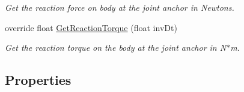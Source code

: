 \begin{DoxyCompactItemize}
\begin{DoxyCompactList}\small\item\em Get the reaction force on body at the joint anchor in Newtons. \end{DoxyCompactList}\item 
override float \hyperlink{class_farseer_physics_1_1_dynamics_1_1_joints_1_1_revolute_joint_a5f3c423d27b54ec925af1462ccb88779}{Get\+Reaction\+Torque} (float inv\+Dt)
\begin{DoxyCompactList}\small\item\em Get the reaction torque on the body at the joint anchor in N$\ast$m. \end{DoxyCompactList}\end{DoxyCompactItemize}
\subsection*{Properties}
